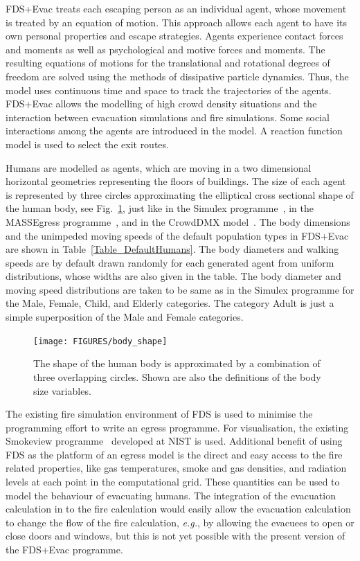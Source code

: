 \documentclass[12pt,a4paper,final,twoside]{stylevk}
\begin{document}
\noindent FDS+Evac treats each escaping person as an individual agent,
whose movement is treated by an equation of motion.  This approach
allows each agent to have its own personal properties and escape
strategies.  Agents experience contact forces and moments as well as
psychological and motive forces and moments.  The resulting equations
of motions for the translational and rotational degrees of freedom are
solved using the methods of dissipative particle dynamics.  Thus, the
model uses continuous time and space to track the trajectories of the
agents.  FDS+Evac allows the modelling of high crowd density
situations and the interaction between evacuation simulations and fire
simulations.  Some social interactions among the agents are introduced
in the model.  A reaction function model is used to select the exit
routes.


Humans are modelled as agents, which are moving in a two dimensional
horizontal geometries representing the floors of buildings.  The size
of each agent is represented by three circles approximating the
elliptical cross sectional shape of the human body, see
Fig.~\ref{Fig_HumanBody}, just like in the Simulex
programme~\cite{Simulex96, Thompson95a, Thompson95b, Thompson03}, in
the MASSEgress programme~\cite{Pan06}, and in the CrowdDMX
model~\cite{Langston06, Langston09}.  The body dimensions and the
unimpeded moving speeds of the default population types in FDS+Evac
are shown in Table~\ref{Table_DefaultHumans}.  The body diameters and
walking speeds are by default drawn randomly for each generated agent
from uniform distributions, whose widths are also given in the table.
The body diameter and moving speed distributions are taken to be same
as in the Simulex programme for the Male, Female, Child, and Elderly
categories.  The category Adult is just a simple superposition of the
Male and Female categories.

%
\begin{figure}[tb]
  \centerline{\texttt{[image: FIGURES/body\_shape]}} 
  \caption{The shape of the human body is approximated by a
    combination of three overlapping circles.  Shown are also the
    definitions of the body size variables.}\label{Fig_HumanBody}
\end{figure}
%

The existing fire simulation environment of FDS is used to minimise
the programming effort to write an egress programme.  For
visualisation, the existing Smokeview programme~\cite{SV_UserGuide}
developed at NIST is used.  Additional benefit of using FDS as the
platform of an egress model is the direct and easy access to the fire
related properties, like gas temperatures, smoke and gas densities,
and radiation levels at each point in the computational grid.  These
quantities can be used to model the behaviour of evacuating humans.
The integration of the evacuation calculation in to the fire
calculation would easily allow the evacuation calculation to change
the flow of the fire calculation, \emph{e.g.}, by allowing the
evacuees to open or close doors and windows, but this is not yet
possible with the present version of the FDS+Evac programme.
\end{document}
